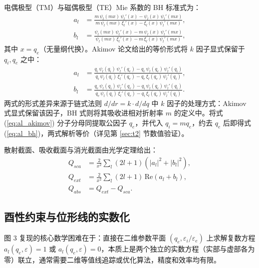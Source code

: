 \documentclass[12pt]{ctexart}
\begin{document}
电偶极型（TM）与磁偶极型（TE）Mie 系数的 BH 标准式为：
\begin{align}
a_l &= \frac{m\,\psi_l(mx)\,\psi_l'(x) - \psi_l(x)\,\psi_l'(mx)}{m\,\psi_l(mx)\,\xi_l'(x) - \xi_l(x)\,\psi_l'(mx)}, \label{eq:al_bh}\\
b_l &= \frac{\psi_l(mx)\,\psi_l'(x) - m\,\psi_l(x)\,\psi_l'(mx)}{\psi_l(mx)\,\xi_l'(x) - m\,\xi_l(x)\,\psi_l'(mx)}, \label{eq:bl_bh}
\end{align}
其中 $x=q_e$（无量纲代换）。Akimov 论文给出的等价形式将 $k$ 因子显式保留于 $q_i,q_e$ 之中：
\begin{align}
a_l &= \frac{q_i\,\psi_l(q_i)\,\psi_l'(q_e) - q_e\,\psi_l(q_e)\,\psi_l'(q_i)}{q_i\,\psi_l(q_i)\,\xi_l'(q_e) - q_e\,\xi_l(q_e)\,\psi_l'(q_i)}, \label{eq:al_akimov}\\
b_l &= \frac{q_e\,\psi_l(q_i)\,\psi_l'(q_e) - q_i\,\psi_l(q_e)\,\psi_l'(q_i)}{q_e\,\psi_l(q_i)\,\xi_l'(q_e) - q_i\,\xi_l(q_e)\,\psi_l'(q_i)}. \label{eq:bl_akimov}
\end{align}
两式的形式差异来源于链式法则 $d/dr = k\cdot d/dq$ 中 $k$ 因子的处理方式：Akimov 式显式保留该因子，BH 式则将其吸收进相对折射率 $m$ 的定义中。将式 (\ref{eq:al_akimov}) 分子分母同提取公因子 $q_e$，并代入 $q_i=mq_e$，约去 $q_e$ 后即得式 (\ref{eq:al_bh})，两式解析等价（详见第 \ref{sec:t2} 节数值验证）。

散射截面、吸收截面与消光截面由光学定理给出：
\begin{align}
Q_{sca} &= \frac{2}{x^2}\sum_l (2l+1)\left(|a_l|^2+|b_l|^2\right), \\
Q_{ext} &= \frac{2}{x^2}\sum_l (2l+1)\,\mathrm{Re}(a_l+b_l), \\
Q_{abs} &= Q_{ext}-Q_{sca}.
\end{align}

\subsection{酉性约束与位形线的实数化}
\label{sec:unitarity}

图 3 复现的核心数学困难在于：直接在二维参数平面 $(q_e, \varepsilon_i/\varepsilon_e)$ 上求解复数方程 $a_l(q_e,\varepsilon)=1$ 或 $a_l(q_e,\varepsilon)=0$，本质上是两个独立的实数方程（实部与虚部各为零）联立，通常需要二维等值线追踪或优化算法，精度和效率均有限。
\end{document}

